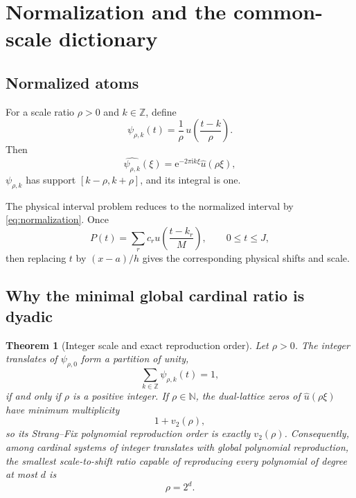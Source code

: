 \documentclass[11pt,oneside]{article}
\newtheorem{theorem}{Theorem}[section]
\theoremstyle{definition}
\theoremstyle{remark}
\newcommand{\Z}{\mathbb Z}
\newcommand{\N}{\mathbb N}
\newcommand{\e}{\mathrm e}
\newcommand{\ii}{\mathrm i}
\newcommand{\vtwo}{v_2}
\begin{document}
\section{Normalization and the common-scale dictionary}

\subsection{Normalized atoms}
For a scale ratio $\rho>0$ and $k\in\Z$, define
\begin{equation}
 \psi_{\rho,k}(t)=\frac1\rho\,
 u\!\left(\frac{t-k}{\rho}\right).                       \label{eq:psi-general}
\end{equation}
Then
\begin{equation}
 \widehat{\psi_{\rho,k}}(\xi)
 =\e^{-2\pi\ii k\xi}\widehat u(\rho\xi),                \label{eq:psi-fourier}
\end{equation}
$\psi_{\rho,k}$ has support $[k-\rho,k+\rho]$, and its integral is one.

The physical interval problem reduces to the normalized interval by \eqref{eq:normalization}.  Once
\begin{equation}
 P(t)=\sum_r c_r u\!\left(\frac{t-k_r}{M}\right),
 \qquad 0\le t\le J,                                      \label{eq:normalized-rep}
\end{equation}
then replacing $t$ by $(x-a)/h$ gives the corresponding physical shifts and scale.

\subsection{Why the minimal global cardinal ratio is dyadic}
\begin{theorem}[Integer scale and exact reproduction order]
\label{thm:scale-classification}
Let $\rho>0$.  The integer translates of $\psi_{\rho,0}$ form a partition of unity,
\begin{equation}
 \sum_{k\in\Z}\psi_{\rho,k}(t)=1,                        \label{eq:rho-partition}
\end{equation}
if and only if $\rho$ is a positive integer.  If $\rho\in\N$, the dual-lattice zeros of $\widehat u(\rho\xi)$ have minimum multiplicity
\begin{equation}
 1+\vtwo(\rho),                                           \label{eq:rho-min-mult}
\end{equation}
so its Strang--Fix polynomial reproduction order is exactly $\vtwo(\rho)$.  Consequently, among cardinal systems of integer translates with global polynomial reproduction, the smallest scale-to-shift ratio capable of reproducing every polynomial of degree at most $d$ is
\begin{equation}
 \boxed{\rho=2^d.}                                        \label{eq:minimal-rho}
\end{equation}
\end{theorem}
\end{document}
